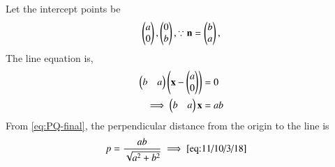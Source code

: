 Let the 
intercept points be
\begin{align}
\begin{pmatrix}a\\0\end{pmatrix},\begin{pmatrix}0\\b\end{pmatrix},
\because	\mathbf{n} = \begin{pmatrix}b\\a\end{pmatrix},
\end{align}
The line equation is,
\begin{align}
\begin{pmatrix}b & a\end{pmatrix}\left(\mathbf{x} - \begin{pmatrix}a\\0\end{pmatrix}\right) &= 0\\
\implies	\begin{pmatrix} b & a\end{pmatrix}\mathbf{x} &= ab
\end{align}
			From \eqref{eq:PQ-final},
the perpendicular distance from the origin  to the line is
\begin{align}
	p  
	&= \frac{ab}{\sqrt{a^2+b^2}}
	\implies 
\eqref{eq:11/10/3/18}
\end{align}
